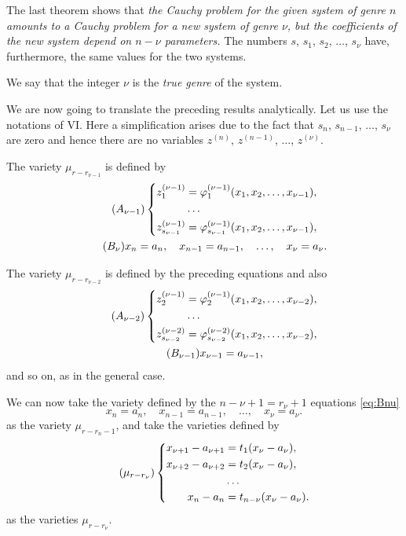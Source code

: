 \documentclass[leqno,11pt]{book}
\makeatletter
\theoremstyle{shape1}
\theoremstyle{shapesmall}
\let\old@phi\phi
\let\old@varphi\varphi
\let\phi\old@varphi
\let\varphi\old@phi
\makeatother
\begin{document}
The last theorem shows that \emph{the Cauchy problem for the given system of genre $n$ amounts to a Cauchy problem for a new system of genre $\nu$, but the coefficients of the new system depend on $n-\nu$ parameters.} The numbers $s$, $s_{1}$, $s_{2}$, $\dots$, $s_{\nu}$ have, furthermore, the same values for the two systems.

We say that the integer $\nu$ is the \emph{true genre} of the system.

We are now going to translate the preceding results analytically. Let us use the notations of \textsection VI. Here a simplification arises due to the fact that $s_{n}$, $s_{n-1}$, $\dots$, $s_{\nu}$ are zero and hence there are no variables $z^{(n)}$, $z^{(n-1)}$, $\dots$, $z^{(\nu)}$.

The variety $\mu_{r-r_{\nu-1}}$ is defined by
\begin{gather}
  \label{eq:Anu1}\tag{$A_{\nu-1}$}
  \left\{
    \begin{aligned}
      z^{(\nu-1)}_{1}&=\phi^{(\nu-1)}_{1}(x_{1},x_{2},\dots,x_{\nu-1}),\\
      &\dots\\
      z^{(\nu-1)}_{s_{\nu-1}}&=\phi^{(\nu-1)}_{s_{\nu-1}}(x_{1},x_{2},\dots,x_{\nu-1}),
    \end{aligned}
  \right.\\
  \label{eq:Bnu}\tag{$B_{\nu}$}
  x_{n}=a_{n},\quad x_{n-1}=a_{n-1},\quad \dots,\quad x_{\nu}=a_{\nu}.
\end{gather}

The variety $\mu_{r-r_{\nu-2}}$ is defined by the preceding equations and also
\begin{gather}
  \label{eq:Anu2}\tag{$A_{\nu-2}$}
  \left\{
    \begin{aligned}
      z^{(\nu-1)}_{2}&=\phi^{(\nu-1)}_{2}(x_{1},x_{2},\dots,x_{\nu-2}),\\
      &\dots\\
      z^{(\nu-2)}_{s_{\nu-2}}&=\phi^{(\nu-2)}_{s_{\nu-2}}(x_{1},x_{2},\dots,x_{\nu-2}),
    \end{aligned}
  \right.\\
  \label{eq:Bnu1}\tag{$B_{\nu-1}$}
  x_{\nu-1}=a_{\nu-1},
\end{gather}
and so on, as in the general case.

We can now take the variety defined by the $n-\nu+1=r_{\nu}+1$ equations \eqref{eq:Bnu} 
\[
  x_{n}=a_{n},\quad x_{n-1}=a_{n-1},\quad \dots,\quad x_{\nu}=a_{\nu}.
\]
as the variety $\mu_{r-r_{n}-1}$, and take the varieties defined by
\begin{equation}
  \label{eq:murrnu}\tag{$\mu_{r-r_{\nu}}$}
  \left\{
    \begin{aligned}
      x_{\nu+1}-a_{\nu+1}&=t_{1}(x_{\nu}-a_{\nu}),\\
      x_{\nu+2}-a_{\nu+2}&=t_{2}(x_{\nu}-a_{\nu}),\\
      &\dots\\
      x_{n}-a_{n}&=t_{n-\nu}(x_{\nu}-a_{\nu}).
    \end{aligned}
  \right.
\end{equation}
as the varieties $\mu_{r-r_{\nu}}$.
\end{document}
